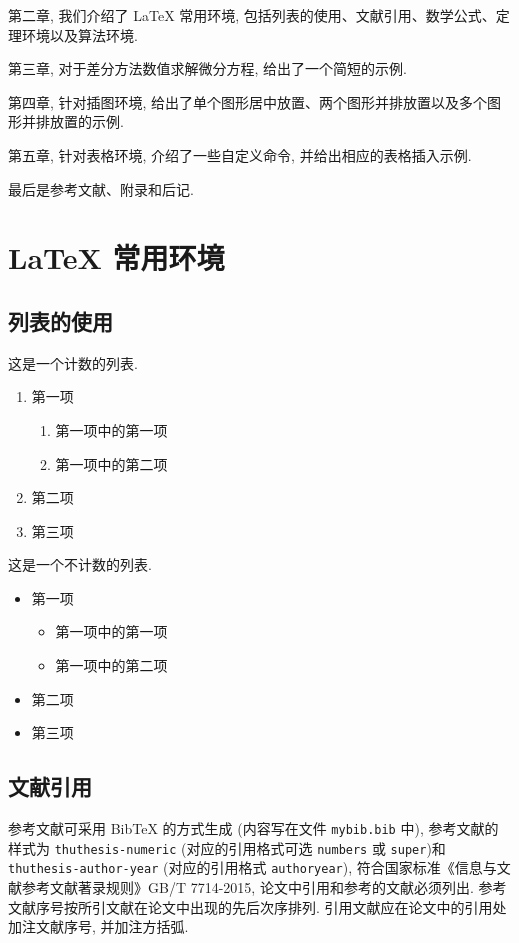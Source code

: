 \documentclass[openany,twoside,12pt]{book}
\theoremstyle{plain}
\begin{document}
第二章, 我们介绍了 LaTeX 常用环境, 包括列表的使用、文献引用、数学公式、定理环境以及算法环境.

第三章, 对于差分方法数值求解微分方程, 给出了一个简短的示例.

第四章, 针对插图环境, 给出了单个图形居中放置、两个图形并排放置以及多个图形并排放置的示例.

第五章, 针对表格环境, 介绍了一些自定义命令, 并给出相应的表格插入示例.

最后是参考文献、附录和后记.




\chapter{LaTeX 常用环境}

\section{列表的使用}

这是一个计数的列表.
\begin{enumerate}%
	\item 第一项
		\begin{enumerate}
			\item 第一项中的第一项
			\item 第一项中的第二项
		\end{enumerate}
	\item 第二项
	\item 第三项
\end{enumerate}

这是一个不计数的列表.
\begin{itemize}%
	\item 第一项
	\begin{itemize}
		\item 第一项中的第一项
		\item 第一项中的第二项
	\end{itemize}
	\item 第二项
	\item 第三项
\end{itemize}


\section{文献引用}

参考文献可采用 BibTeX 的方式生成 (内容写在文件 \verb|mybib.bib| 中), 参考文献的样式为 \verb|thuthesis-numeric| (对应的引用格式可选 \verb|numbers| 或  \verb|super|)和 \verb|thuthesis-author-year| (对应的引用格式 \verb|authoryear|), 符合国家标准《信息与文献参考文献著录规则》GB/T 7714-2015, 论文中引用和参考的文献必须列出. 参考文献序号按所引文献在论文中出现的先后次序排列. 引用文献应在论文中的引用处加注文献序号, 并加注方括弧.
\end{document}
